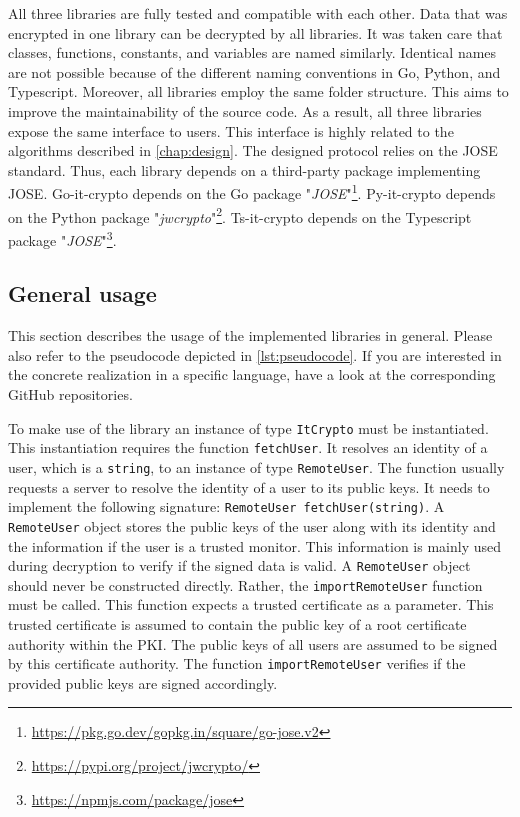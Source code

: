 \documentclass[../main.tex]{subfiles}
\begin{document}
All three libraries are fully tested and compatible with each other.
Data that was encrypted in one library can be decrypted by all libraries.
It was taken care that classes, functions, constants, and variables are named similarly.
Identical names are not possible because of the different naming conventions in Go, Python, and Typescript.
Moreover, all libraries employ the same folder structure.
This aims to improve the maintainability of the source code.
As a result, all three libraries expose the same interface to users.
This interface is highly related to the algorithms described in \cref{chap:design}.
The designed protocol relies on the JOSE standard.
Thus, each library depends on a third-party package implementing JOSE.
Go-it-crypto depends on the Go package "\emph{JOSE}"\footnote{\url{https://pkg.go.dev/gopkg.in/square/go-jose.v2}}.
Py-it-crypto depends on the Python package "\emph{jwcrypto}"\footnote{\url{https://pypi.org/project/jwcrypto/}}.
Ts-it-crypto depends on the Typescript package "\emph{JOSE}"\footnote{\url{https://npmjs.com/package/jose}}.


\subsection{General usage}

This section describes the usage of the implemented libraries in general.
Please also refer to the pseudocode depicted in \cref{lst:pseudocode}.
If you are interested in the concrete realization in a specific language, have a look at the corresponding GitHub repositories.

To make use of the library an instance of type \verb|ItCrypto| must be instantiated.
This instantiation requires the function \verb|fetchUser|.
It resolves an identity of a user, which is a \verb|string|, to an instance of type \verb|RemoteUser|.
The function usually requests a server to resolve the identity of a user to its public keys.
It needs to implement the following signature: \verb|RemoteUser fetchUser(string)|.
A \verb|RemoteUser| object stores the public keys of the user along with its identity and the information if the user is a trusted monitor.
This information is mainly used during decryption to verify if the signed data is valid.
A \verb|RemoteUser| object should never be constructed directly.
Rather, the \verb|importRemoteUser| function must be called.
This function expects a trusted certificate as a parameter.
This trusted certificate is assumed to contain the public key of a root certificate authority within the PKI.
The public keys of all users are assumed to be signed by this certificate authority.
The function \verb|importRemoteUser| verifies if the provided public keys are signed accordingly.
\end{document}
